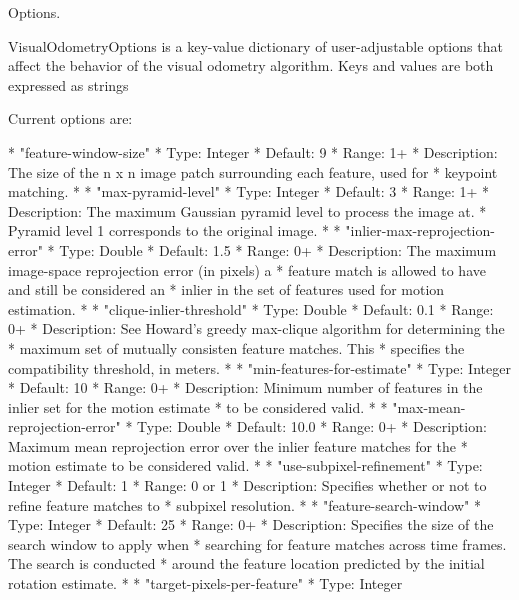 Options. 

VisualOdometryOptions is a key-\/value dictionary of user-\/adjustable options that affect the behavior of the visual odometry algorithm. Keys and values are both expressed as strings

Current options are: \begin{DoxyVerb}
 *   "feature-window-size"
 *     Type:        Integer
 *     Default:     9
 *     Range:       1+
 *     Description: The size of the n x n image patch surrounding each feature, used for
 *                  keypoint matching.
 *      
 *   "max-pyramid-level"
 *     Type:        Integer
 *     Default:     3
 *     Range:       1+
 *     Description: The maximum Gaussian pyramid level to process the image at.
 *                  Pyramid level 1 corresponds to the original image.
 *
 *   "inlier-max-reprojection-error"
 *     Type:        Double
 *     Default:     1.5
 *     Range:       0+
 *     Description: The maximum image-space reprojection error (in pixels) a
 *                  feature match is allowed to have and still be considered an
 *                  inlier in the set of features used for motion estimation.
 *
 *   "clique-inlier-threshold"
 *     Type:        Double
 *     Default:     0.1
 *     Range:       0+
 *     Description: See Howard's greedy max-clique algorithm for determining the 
 *                  maximum set of mutually consisten feature matches.  This
 *                  specifies the compatibility threshold, in meters.
 *
 *   "min-features-for-estimate"
 *     Type:        Integer
 *     Default:     10
 *     Range:       0+
 *     Description: Minimum number of features in the inlier set for the motion estimate
 *     to be considered valid.
 *
 *   "max-mean-reprojection-error"
 *     Type:        Double
 *     Default:     10.0
 *     Range:       0+
 *     Description: Maximum mean reprojection error over the inlier feature matches for the
 *     motion estimate to be considered valid.
 *
 *   "use-subpixel-refinement"
 *     Type:        Integer
 *     Default:     1
 *     Range:       0 or 1
 *     Description: Specifies whether or not to refine feature matches to
 *     subpixel resolution.
 *
 *   "feature-search-window"
 *     Type:        Integer
 *     Default:     25
 *     Range:       0+
 *     Description: Specifies the size of the search window to apply when
 *     searching for feature matches across time frames.  The search is conducted
 *     around the feature location predicted by the initial rotation estimate.
 *
 *   "target-pixels-per-feature"
 *     Type:        Integer

\end{DoxyVerb}
